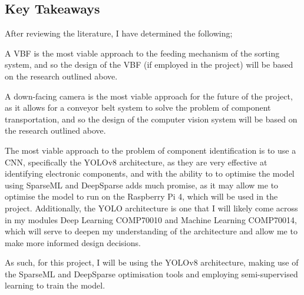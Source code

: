 \subsection{Key Takeaways}
After reviewing the literature, I have determined the following;

A VBF is the most viable approach to the feeding mechanism of the sorting system, and so the design of the VBF (if employed in the project) will be based on the research outlined above.

A down-facing camera is the most viable approach for the future of the project, as it allows for a conveyor belt system to solve the problem of component transportation, and so the design of the computer vision system will be based on the research outlined above.

The most viable approach to the problem of component identification is to use a CNN, specifically the YOLOv8 architecture, as they are very effective at identifying electronic components, and with the ability to
to optimise the model using SparseML and DeepSparse adds much promise, as it may allow me to optimise the model to run on the Raspberry Pi 4, which will be used in the project. 
Additionally, the YOLO architecture is one that I will likely come across in my modules Deep Learning COMP70010 and Machine Learning COMP70014, which will serve
to deepen my understanding of the architecture and allow me to make more informed design decisions.

As such, for this project, I will be using the YOLOv8 architecture, making use of the SparseML and DeepSparse optimisation tools and employing semi-supervised learning to train the model.
